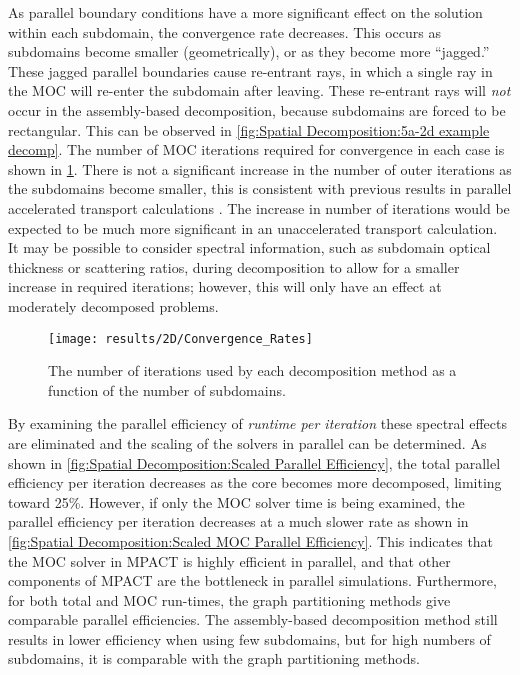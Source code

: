 {{{{        As parallel boundary conditions have a more significant effect on the solution within each subdomain, the convergence rate decreases.
        This occurs as subdomains become smaller (geometrically), or as they become more ``jagged.''
        These jagged parallel boundaries cause re-entrant rays, in which a single ray in the \ac{MOC} will re-enter the subdomain after leaving.
        These re-entrant rays will \emph{not} occur in the assembly-based decomposition, because subdomains are forced to be rectangular.
        This can be observed in \cref{fig:Spatial Decomposition:5a-2d example decomp}.
        The number of \ac{MOC} iterations required for convergence in each case is shown in \cref{fig:Spatial Decomposition:Convergence}.
        There is not a significant increase in the number of outer iterations as the subdomains become smaller, this is consistent with previous results in parallel accelerated transport calculations \cite{Kelley2012,Stimpson2014,Kochunas2014}.
        The increase in number of iterations would be expected to be much more significant in an unaccelerated transport calculation.
        It may be possible to consider spectral information, such as subdomain optical thickness or scattering ratios, during decomposition to allow for a smaller increase in required iterations; however, this will only have an effect at moderately decomposed problems.

        \begin{figure}
          \centering
          \texttt{[image: results/2D/Convergence\_Rates]}
          \caption{The number of iterations used by each decomposition method as a function of the number of subdomains. \label{fig:Spatial Decomposition:Convergence}}
        \end{figure}

        By examining the parallel efficiency of \emph{runtime per iteration} these spectral effects are eliminated and the scaling of the solvers in parallel can be determined.
        As shown in \cref{fig:Spatial Decomposition:Scaled Parallel Efficiency}, the total parallel efficiency per iteration decreases as the core becomes more decomposed, limiting toward 25\%.
        However, if only the \ac{MOC} solver time is being examined, the parallel efficiency per iteration decreases at a much slower rate as shown in \cref{fig:Spatial Decomposition:Scaled MOC Parallel Efficiency}.
        This indicates that the \ac{MOC} solver in MPACT is highly efficient in parallel, and that other components of MPACT are the bottleneck in parallel simulations.
        Furthermore, for both total and \ac{MOC} run-times, the graph partitioning methods give comparable parallel efficiencies.
        The assembly-based decomposition method still results in lower efficiency when using few subdomains, but for high numbers of subdomains, it is comparable with the graph partitioning methods.

}}}}
